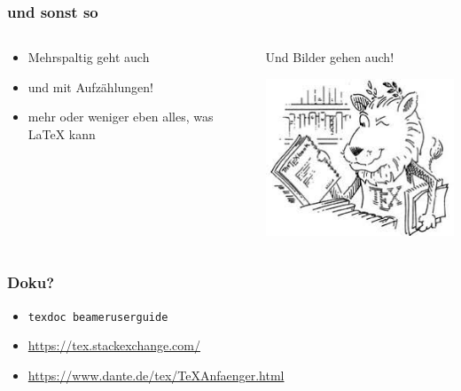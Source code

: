 \documentclass{beamer}
\begin{document}
\begin{frame}
  \frametitle{und sonst so}

  \onslide<+->

  \begin{columns}
    \begin{column}{0.45\linewidth}
      \begin{itemize}
      \item<+-> Mehrspaltig geht auch
      \item<+-> und mit Aufzählungen!
      \item<+-> mehr oder weniger eben alles, was \LaTeX{} kann
      \end{itemize}
    \end{column}

    \begin{column}{0.45\linewidth}
      \onslide<+->

      Und Bilder gehen auch!

      \begin{center}
        \includegraphics[width=\linewidth]{img/tex-lion.jpg}
      \end{center}

    \end{column}
  \end{columns}

\end{frame}

\begin{frame}[fragile]
  \frametitle{Doku?}

  \onslide<+->

  \begin{itemize}
  \item \verb!texdoc beameruserguide!
  \item \url{https://tex.stackexchange.com/}
  \item \url{https://www.dante.de/tex/TeXAnfaenger.html}
  \end{itemize}

\end{frame}
\end{document}
